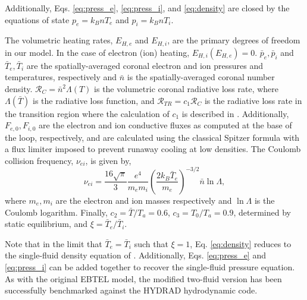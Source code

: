 \documentclass[iop]{emulateapj}
\begin{document}
	Additionally, Eqs. \ref{eq:press_e}, \ref{eq:press_i}, and \ref{eq:density} are closed by the equations of state $p_e=k_BnT_e$ and $p_i=k_BnT_i$. 
	\par The volumetric heating rates, $E_{H,e}$ and $E_{H,i}$, are the primary degrees of freedom in our model. In the case of electron (ion) heating, $E_{H,i}(E_{H,e})=0$. $\bar{p}_e,\bar{p}_i$ and $\bar{T}_e,\bar{T}_i$ are the spatially-averaged coronal electron and ion pressures and temperatures, respectively and $\bar{n}$ is the spatially-averaged coronal number density. $\mathcal{R}_C=\bar{n}^2\Lambda(T)$ is the volumetric coronal radiative loss rate, where $\Lambda(\bar{T})$ is the radiative loss function, and $\mathcal{R}_{TR}=c_1\mathcal{R}_C$ is the radiative loss rate in the transition region where the calculation of $c_1$ is described in \citet{cargill_enthalpy-based_2012}. Additionally, $F_{e,0},F_{i,0}$ are the electron and ion conductive fluxes as computed at the base of the loop, respectively, and are calculated using the classical Spitzer formula with a flux limiter imposed to prevent runaway cooling at low densities. The Coulomb collision frequency, $\nu_{ei}$, is given by,
\begin{equation}
	\nu_{ei} = \frac{16\sqrt{\pi}}{3}\frac{e^4}{m_em_i}\left(\frac{2k_B\bar{T}_e}{m_e}\right)^{-3/2}\bar{n}\ln{\Lambda},
\end{equation}
where $m_e,m_i$ are the electron and ion masses respectively and $\ln{\Lambda}$ is the Coulomb logarithm. Finally, $c_2=\bar{T}/T_a=0.6$, $c_3=T_0/T_a=0.9$, determined by static equilibrium, and $\xi=\bar{T}_e/\bar{T}_i$.
%
\par Note that in the limit that $\bar{T}_e=\bar{T}_i$ such that $\xi=1$, Eq. \ref{eq:density} reduces to the single-fluid density equation of \citet{cargill_enthalpy-based_2012}. Additionally, Eqs. \ref{eq:press_e} and \ref{eq:press_i} can be added together to recover the single-fluid pressure equation. As with the original EBTEL model, the modified two-fluid version has been successfully benchmarked against the HYDRAD hydrodynamic code. 
\end{document}
